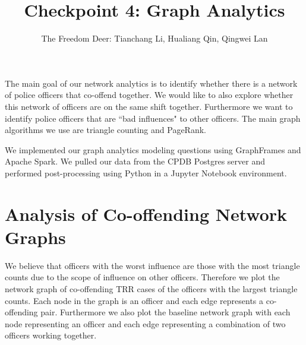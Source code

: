 \documentclass[10pt]{article}
\title{Checkpoint 4: Graph Analytics}
\author{The Freedom Deer: Tianchang Li, Hualiang Qin, Qingwei Lan}
\begin{document}
\maketitle


The main goal of our network analytics is to identify whether there is a network of police officers that co-offend together. We would like to also explore whether this network of officers are on the same shift together. Furthermore we want to identify police officers that are ``bad influences" to other officers. The main graph algorithms we use are triangle counting and PageRank.

We implemented our graph analytics modeling questions using GraphFrames and Apache Spark. We pulled our data from the CPDB Postgres server and performed post-processing using Python in a Jupyter Notebook environment. 



\section{Analysis of Co-offending Network Graphs}

We believe that officers with the worst influence are those with the most triangle counts due to the scope of influence on other officers. Therefore we plot the network graph of co-offending TRR cases of the officers with the largest triangle counts. Each node in the graph is an officer and each edge represents a co-offending pair. Furthermore we also plot the baseline network graph with each node representing an officer and each edge representing a combination of two officers working together.
\end{document}
